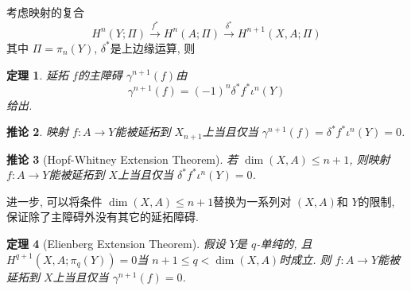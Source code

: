 \documentclass{ctexart}
\theoremstyle{plain}
\newtheorem{theorem}{定理}[section]
\newtheorem{corollary}[theorem]{推论}
\theoremstyle{definition}
\begin{document}
            考虑映射的复合 
            \begin{equation*}
              H^{n}(Y;\Pi)\stackrel{f^{*}}{\rightarrow}H^{n}(A;\Pi)\stackrel{\delta^{*}}{\rightarrow}H^{n+1}(X,A;\Pi)
            \end{equation*}
            其中 $\Pi=\pi_{n}(Y)$, $\delta^{*}$是上边缘运算, 则 

            \begin{theorem}
                \label{thm:connection between primary obstruction and characteristic class}
                延拓 $f$的主障碍 $\gamma^{n+1}(f)$由 
                \begin{equation*}
                  \gamma^{n+1}(f)=(-1)^{n}\delta^{*}f^{*}\iota^{n}(Y)
                \end{equation*}
                给出.
            \end{theorem}

            \begin{corollary}
                映射 $f:A\to Y$能被延拓到 $X_{n+1}$上当且仅当 $\gamma^{n+1}(f)=\delta^{*}f^{*}\iota^{n}(Y)=0$.
            \end{corollary}

            \begin{corollary}[Hopf-Whitney Extension Theorem]
                若 $\operatorname{dim}(X,A)\le n+1$, 则映射 $f:A\to Y$能被延拓到 $X$上当且仅当 $\delta^{*}f^{*}\iota^{n}(Y)=0$.
            \end{corollary}

            进一步, 可以将条件 $\operatorname{dim}(X,A)\le n+1$替换为一系列对 $(X,A)$和 $Y$的限制, 保证除了主障碍外没有其它的延拓障碍.

            \begin{theorem}[Elienberg Extension Theorem]
                \label{thm:Elienberg Extension Theorem}
                假设 $Y$是 $q$-单纯的, 且 $H^{q+1}(X,A; \pi_{q}(Y))=0$当 $n+1\le q<\operatorname{dim}(X,A)$时成立. 则 $f:A\to Y$能被延拓到 $X$上当且仅当 $\gamma^{n+1}(f)=0$.
            \end{theorem}
\end{document}

